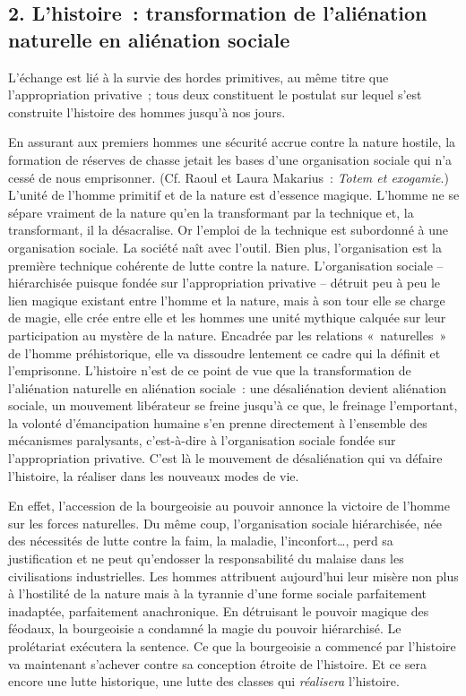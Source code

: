 \documentclass[french,twoside]{book} %
\begin{document}
\subsection[{2. L’histoire : transformation de l’aliénation naturelle en aliénation sociale}]{\textsc{2.} L’histoire : transformation de l’aliénation naturelle en aliénation sociale}
\noindent L’échange est lié à la survie des hordes primitives, au même titre que l’appropriation privative ; tous deux constituent le postulat sur lequel s’est construite l’histoire des hommes jusqu’à nos jours.\par
En assurant aux premiers hommes une sécurité accrue contre la nature hostile, la formation de réserves de chasse jetait les bases d’une organisation sociale qui n’a cessé de nous emprisonner. (Cf. Raoul et Laura Makarius : \emph{Totem et exogamie}.) L’unité de l’homme primitif et de la nature est d’essence magique. L’homme ne se sépare vraiment de la nature qu’en la transformant par la technique et, la transformant, il la désacralise. Or l’emploi de la technique est subordonné à une organisation sociale. La société naît avec l’outil. Bien plus, l’organisation est la première technique cohérente de lutte contre la nature. L’organisation sociale – hiérarchisée puisque fondée sur l’appropriation privative – détruit peu à peu le lien magique existant entre l’homme et la nature, mais à son tour elle se charge de magie, elle crée entre elle et les hommes une unité mythique calquée sur leur participation au mystère de la nature. Encadrée par les relations « naturelles » de l’homme préhistorique, elle va dissoudre lentement ce cadre qui la définit et l’emprisonne. L’histoire n’est de ce point de vue que la transformation de l’aliénation naturelle en aliénation sociale : une désaliénation devient aliénation sociale, un mouvement libérateur se freine jusqu’à ce que, le freinage l’emportant, la volonté d’émancipation humaine s’en prenne directement à l’ensemble des mécanismes paralysants, c’est-à-dire à l’organisation sociale fondée sur l’appropriation privative. C’est là le mouvement de désaliénation qui va défaire l’histoire, la réaliser dans les nouveaux modes de vie.\par
En effet, l’accession de la bourgeoisie au pouvoir annonce la victoire de l’homme sur les forces naturelles. Du même coup, l’organisation sociale hiérarchisée, née des nécessités de lutte contre la faim, la maladie, l’inconfort…, perd sa justification et ne peut qu’endosser la responsabilité du malaise dans les civilisations industrielles. Les hommes attribuent aujourd’hui leur misère non plus à l’hostilité de la nature mais à la tyrannie d’une forme sociale parfaitement inadaptée, parfaitement anachronique. En détruisant le pouvoir magique des féodaux, la bourgeoisie a condamné la magie du pouvoir hiérarchisé. Le prolétariat exécutera la sentence. Ce que la bourgeoisie a commencé par l’histoire va maintenant s’achever contre sa conception étroite de l’histoire. Et ce sera encore une lutte historique, une lutte des classes qui \emph{réalisera} l’histoire.\par
\end{document}
